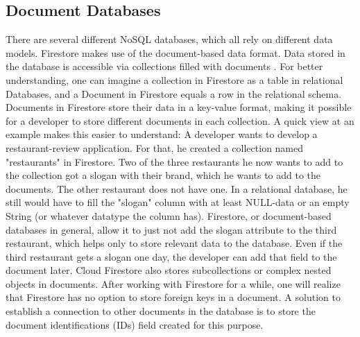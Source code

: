 \subsection{Document Databases}
There are several different NoSQL databases, which all rely on different data models. Firestore makes use of the document-based data format. Data stored in the database is accessible via collections filled with documents \cite{.firestore}. For better understanding, one can imagine a collection in Firestore as a table in relational Databases, and a Document in Firestore equals a row in the relational schema. Documents in Firestore store their data in a key-value format, making it possible for a developer to store different documents in each collection. A quick view at an example makes this easier to understand: A developer wants to develop a restaurant-review application. For that, he created a collection named "restaurants" in Firestore. Two of the three restaurants he now wants to add to the collection got a slogan with their brand, which he wants to add to the documents. The other restaurant does not have one. In a relational database, he still would have to fill the "slogan" column with at least NULL-data or an empty String (or whatever datatype the column has). Firestore, or document-based databases in general, allow it to just not add the slogan attribute to the third restaurant, which helps only to store relevant data to the database. Even if the third restaurant gets a slogan one day, the developer can add that field to the document later. Cloud Firestore also stores subcollections or complex nested objects in documents. After working with Firestore for a while, one will realize that Firestore has no option to store foreign keys in a document. A solution to establish a connection to other documents in the database is to store the document identifications (IDs) field created for this purpose. 